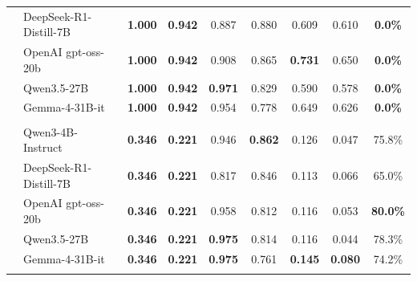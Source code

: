 \begin{table}[t]
\begin{tabular}{llccccccc}
 & DeepSeek-R1-Distill-7B & \textbf{1.000} & \textbf{0.942} & 0.887 & 0.880 & 0.609 & 0.610 & \textbf{0.0\%} \\
 & OpenAI gpt-oss-20b & \textbf{1.000} & \textbf{0.942} & 0.908 & 0.865 & \textbf{0.731} & 0.650 & \textbf{0.0\%} \\
 & Qwen3.5-27B & \textbf{1.000} & \textbf{0.942} & \textbf{0.971} & 0.829 & 0.590 & 0.578 & \textbf{0.0\%} \\
 & Gemma-4-31B-it & \textbf{1.000} & \textbf{0.942} & 0.954 & 0.778 & 0.649 & 0.626 & \textbf{0.0\%} \\
\addlinespace[3pt]
\multicolumn{9}{l}{\textit{Near-Miss Strict (Adversarial Abstention Stress Test)}} \\
 & Qwen3-4B-Instruct & \textbf{0.346} & \textbf{0.221} & 0.946 & \textbf{0.862} & 0.126 & 0.047 & 75.8\% \\
 & DeepSeek-R1-Distill-7B & \textbf{0.346} & \textbf{0.221} & 0.817 & 0.846 & 0.113 & 0.066 & 65.0\% \\
 & OpenAI gpt-oss-20b & \textbf{0.346} & \textbf{0.221} & 0.958 & 0.812 & 0.116 & 0.053 & \textbf{80.0\%} \\
 & Qwen3.5-27B & \textbf{0.346} & \textbf{0.221} & \textbf{0.975} & 0.814 & 0.116 & 0.044 & 78.3\% \\
 & Gemma-4-31B-it & \textbf{0.346} & \textbf{0.221} & \textbf{0.975} & 0.761 & \textbf{0.145} & \textbf{0.080} & 74.2\% \\
\addlinespace[3pt]
\bottomrule
\end{tabular}
\end{table}
